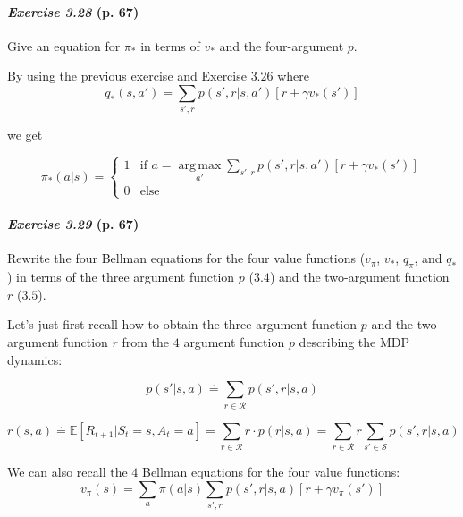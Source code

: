 \documentclass[10pt,a4paper]{article}
\DeclareMathOperator*{\argmax}{arg\,max}
\begin{document}
\paragraph{\textit{Exercise 3.28} (p. 67)} Give an equation for $\pi_*$ in terms of $v_*$ and the four-argument $p$.

\bigskip
By using the previous exercise and Exercise $3.26$ where
\begin{equation}
q_*(s, a') = \sum_{s', r} p(s', r \lvert s, a') \left[r + \gamma v_*(s')\right]
\end{equation}

we get

\begin{equation}
\pi_*(a \lvert s) = \begin{cases} 1 & \textrm{if } a = \argmax\limits_{a'} \sum_{s', r} p(s', r \lvert s, a') \left[r + \gamma v_*(s')\right] \\ 0 & \textrm{else}\end{cases}
\end{equation}

\paragraph{\textit{Exercise 3.29} (p. 67)} Rewrite the four Bellman equations for the four value functions ($v_\pi$, $v_*$, $q_\pi$,
and $q_*$) in terms of the three argument function $p$ ($3.4$) and the two-argument function $r$
($3.5$).

\bigskip
Let's just first recall how to obtain the three argument function $p$ and the two-argument function $r$ from the $4$ argument function $p$ describing the MDP dynamics:

\begin{equation}
p(s' \lvert s, a) \doteq \sum_{r \in \mathcal{R}} p(s', r \lvert s, a)
\end{equation}

\begin{equation}
r(s, a) \doteq \mathbb{E}[R_{t+1} \lvert S_t = s, A_t= a] = \sum_{r \in \mathcal{R}} r \cdot p(r \lvert s, a) = \sum_{r \in \mathcal{R}} r \sum_{s' \in \mathcal{S}} p(s', r \lvert s, a)
\end{equation}

We can also recall the $4$ Bellman equations for the four value functions:
\begin{equation}
v_\pi(s) = \sum_{a} \pi(a \lvert s) \sum_{s', r} p(s', r \lvert s, a) \left[r + \gamma v_\pi(s')\right]
\end{equation}
\end{document}
